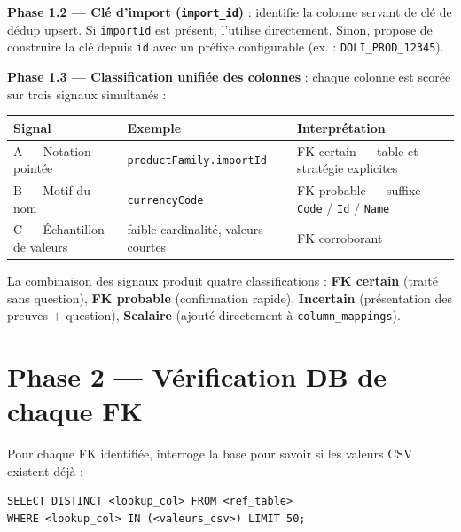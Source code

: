 \noindent\textbf{Phase 1.2 — Clé d'import (\texttt{import\_id})} : identifie la colonne
servant de clé de dédup upsert. Si \texttt{importId} est présent, l'utilise directement.
Sinon, propose de construire la clé depuis \texttt{id} avec un préfixe configurable
(ex. : \texttt{DOLI\_PROD\_12345}).

\medskip
\noindent\textbf{Phase 1.3 — Classification unifiée des colonnes} : chaque colonne est
scorée sur trois signaux simultanés :

\begin{center}
\renewcommand{\arraystretch}{1.4}
{\small
\begin{tabular}{|p{3.4cm}|p{4.0cm}|p{6.0cm}|}
  \hline
  \textbf{Signal} & \textbf{Exemple} & \textbf{Interprétation} \\
  \hline
  A — Notation pointée & \texttt{productFamily.}\newline\texttt{importId} & FK certain — table et stratégie explicites \\
  \hline
  B — Motif du nom & \texttt{currencyCode} & FK probable — suffixe \texttt{Code} / \texttt{Id} / \texttt{Name} \\
  \hline
  C — Échantillon de valeurs & faible cardinalité, valeurs courtes & FK corroborant \\
  \hline
\end{tabular}}
\end{center}

\noindent La combinaison des signaux produit quatre classifications :
\textbf{FK certain} (traité sans question), \textbf{FK probable} (confirmation rapide),
\textbf{Incertain} (présentation des preuves + question), \textbf{Scalaire} (ajouté
directement à \texttt{column\_mappings}).

\section*{Phase 2 — Vérification DB de chaque FK}

Pour chaque FK identifiée, interroge la base pour savoir si les valeurs CSV existent déjà :

\begin{lstlisting}[language={}, basicstyle=\ttfamily\footnotesize, frame=single,
                   backgroundcolor=\color{gray!4}]
SELECT DISTINCT <lookup_col> FROM <ref_table>
WHERE <lookup_col> IN (<valeurs_csv>) LIMIT 50;
\end{lstlisting}


